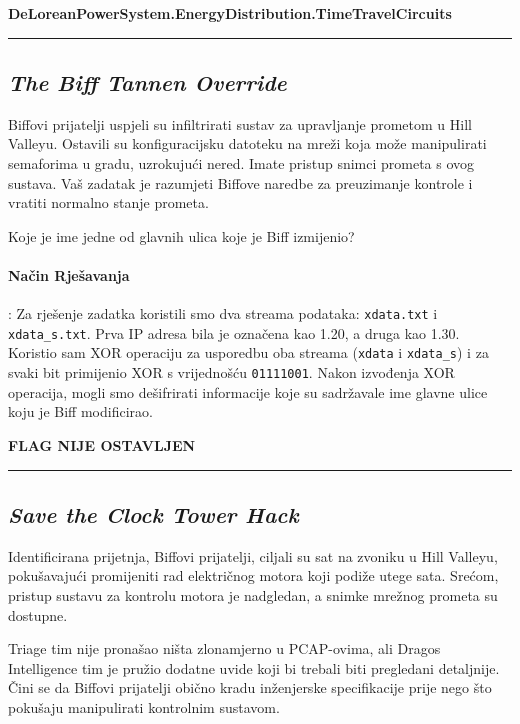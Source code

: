 \documentclass{article}
\begin{document}
\begin{center}
    \textbf{DeLoreanPowerSystem.EnergyDistribution.TimeTravelCircuits}
\end{center}

\noindent\rule{\textwidth}{0.4pt}

\subsection{\textit{The Biff Tannen Override}}
\begin{tcolorbox}[
    colback=gray!5,  %
    colframe=gray!75,  %
    title=\textbf{Zadatak}]
    Biffovi prijatelji uspjeli su infiltrirati sustav za upravljanje prometom u Hill Valleyu. Ostavili su konfiguracijsku datoteku na mreži koja može manipulirati semaforima u gradu, uzrokujući nered. Imate pristup snimci prometa s ovog sustava. Vaš zadatak je razumjeti Biffove naredbe za preuzimanje kontrole i vratiti normalno stanje prometa.

    Koje je ime jedne od glavnih ulica koje je Biff izmijenio?
\end{tcolorbox}

\paragraph{Način Rješavanja}:
Za rješenje zadatka koristili smo dva streama podataka: \texttt{xdata.txt} i \texttt{xdata\_s.txt}. Prva IP adresa bila je označena kao 1.20, a druga kao 1.30. Koristio sam XOR operaciju za usporedbu oba streama (\texttt{xdata} i \texttt{xdata\_s}) i za svaki bit primijenio XOR s vrijednošću \texttt{01111001}. Nakon izvođenja XOR operacija, mogli smo dešifrirati informacije koje su sadržavale ime glavne ulice koju je Biff modificirao.

\begin{center}
    \textbf{FLAG NIJE OSTAVLJEN}
\end{center}

\noindent\rule{\textwidth}{0.4pt}

\subsection{\textit{Save the Clock Tower Hack}}
\begin{tcolorbox}[
    colback=gray!5,  %
    colframe=gray!75,  %
    title=\textbf{Zadatak}]
    Identificirana prijetnja, Biffovi prijatelji, ciljali su sat na zvoniku u Hill Valleyu, pokušavajući promijeniti rad električnog motora koji podiže utege sata. Srećom, pristup sustavu za kontrolu motora je nadgledan, a snimke mrežnog prometa su dostupne.

    Triage tim nije pronašao ništa zlonamjerno u PCAP-ovima, ali Dragos Intelligence tim je pružio dodatne uvide koji bi trebali biti pregledani detaljnije. Čini se da Biffovi prijatelji obično kradu inženjerske specifikacije prije nego što pokušaju manipulirati kontrolnim sustavom.
\end{tcolorbox}
\end{document}
